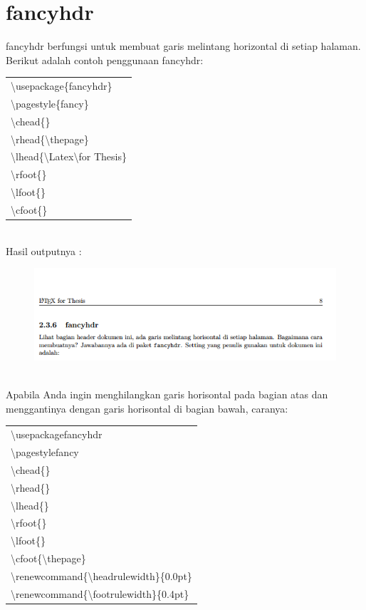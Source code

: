 \section{fancyhdr}
fancyhdr berfungsi untuk membuat garis melintang horizontal di setiap halaman. Berikut adalah contoh penggunaan fancyhdr:\\[0.5 cm]
\begin{tabular}{|p{13.5 cm}|}
\hline
\textbackslash usepackage\{fancyhdr\} \\
   \textbackslash pagestyle\{fancy\}\\
    \textbackslash chead\{\} \\
    \textbackslash rhead\{\textbackslash thepage\} \\
\textbackslash lhead\{\textbackslash Latex\textbackslash for Thesis\}\\ 
    \textbackslash rfoot\{\} \\
     \textbackslash lfoot\{\} \\
     \textbackslash cfoot\{\}\\
\hline
\end{tabular}\\[0.5 cm]
Hasil outputnya :\\
\begin{figure}[h!]
\centering
\includegraphics[width=10 cm]{img/6.png}
\end{figure}\\[0.5 cm]
Apabila Anda ingin menghilangkan garis horisontal pada bagian atas dan menggantinya dengan garis horisontal di bagian bawah, caranya:\\[0.5 cm]
\begin{tabular}{|p{13.5 cm}|}
\hline
 \textbackslash usepackage{fancyhdr}\\ 
 \textbackslash pagestyle{fancy} \\
   \textbackslash chead\{\} \\
   \textbackslash rhead\{\}  \\
   \textbackslash lhead\{\} \\
   \textbackslash rfoot\{\} \\
   \textbackslash lfoot\{\} \\
   \textbackslash cfoot\{\textbackslash thepage\}\\
  \textbackslash renewcommand\{\textbackslash headrulewidth\}\{0.0pt\}\\ 
 \textbackslash renewcommand\{\textbackslash footrulewidth\}\{0.4pt\}\\
\hline
\end{tabular}
